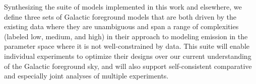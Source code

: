 \documentclass[twocolumn]{aastex631}
\newcommand{\giuse}[1]{\textcolor{orange}{(GP: #1)}}
\begin{document}



Synthesizing the suite of models implemented in this work and elsewhere, we define three sets of Galactic foreground models that are both driven by the existing data where they are unambiguous and span a range of complexities (labeled low, medium, and high) in their approach to modeling emission in the parameter space where it is not well-constrained by data. This suite will enable individual experiments to optimize their designs over our current understanding of the Galactic foreground sky, and will also support self-consistent comparative and especially joint analyses of multiple experiments. 
\end{document}
